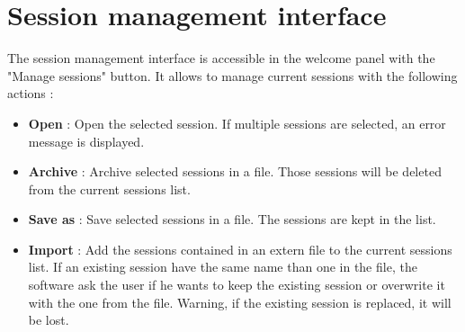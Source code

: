 \section{Session management interface}
The session management interface is accessible in the welcome panel with the "Manage sessions" button. It allows to manage current sessions with the following actions :\\
\begin{itemize}

\item \textbf{Open} : Open the selected session. If multiple sessions are selected, an error message is displayed.\\
\item \textbf{Archive} : Archive selected sessions in a file. Those sessions will be deleted from the current sessions list.\\
\item \textbf{Save as} : Save selected sessions in a file. The sessions are kept in the list.\\
\item \textbf{Import} : Add the sessions contained in an extern file to the current sessions list. If an existing session have the same name than one in the file, the software ask the user if he wants to keep the existing session or overwrite it with the one from the file. Warning, if the existing session is replaced, it will be lost.\\

\end{itemize}
